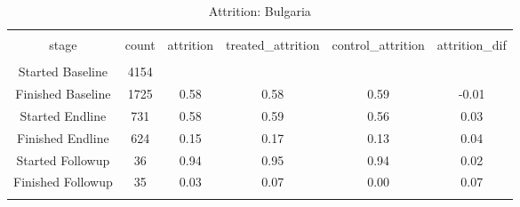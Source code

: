 
\begin{table}[H] \centering 
  \caption{Attrition: Bulgaria} 
  \label{tbl:Attrition: Bulgaria} 
\begin{tabular}{@{\extracolsep{5pt}} cccccc} 
\\[-1.8ex]\hline 
\hline \\[-1.8ex] 
stage & count & attrition & treated\_attrition & control\_attrition & attrition\_dif \\ 
\hline \\[-1.8ex] 
Started Baseline & 4154 &  &  &  &  \\ 
Finished Baseline & 1725 & 0.58 & 0.58 & 0.59 & -0.01 \\ 
Started Endline &  731 & 0.58 & 0.59 & 0.56 &  0.03 \\ 
Finished Endline &  624 & 0.15 & 0.17 & 0.13 &  0.04 \\ 
Started Followup &   36 & 0.94 & 0.95 & 0.94 &  0.02 \\ 
Finished Followup &   35 & 0.03 & 0.07 & 0.00 &  0.07 \\ 
\hline \\[-1.8ex] 
\end{tabular} 
\end{table} 
